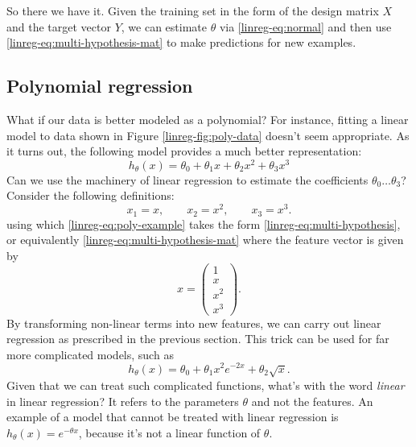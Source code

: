 \documentclass{article}
\begin{document}
So there we have it. Given the training set in the form of the design matrix $X$ and the target vector $Y$, we can estimate $\theta$ via \eqref{linreg-eq:normal} and then use \eqref{linreg-eq:multi-hypothesis-mat} to make predictions for new examples.


\subsection{Polynomial regression}
What if our data is better modeled as a polynomial? For instance, fitting a linear model to data shown in Figure \ref{linreg-fig:poly-data} doesn't seem appropriate. As it turns out, the following model provides a much better representation:
\begin{equation}
h_\theta(x) = \theta_0 + \theta_1 x + \theta_2 x^2 + \theta_3 x^3
\label{linreg-eq:poly-example}
\end{equation}
Can we use the machinery of linear regression to estimate the coefficients $\theta_0\dots\theta_3$? Consider the following definitions:
\begin{equation}
    x_1 = x, \qquad x_2 = x^2, \qquad x_3 = x^3.
\end{equation}
using which \eqref{linreg-eq:poly-example} takes the form \eqref{linreg-eq:multi-hypothesis}, or equivalently \eqref{linreg-eq:multi-hypothesis-mat} where the feature vector is given by
\begin{equation}
    x=
    \begin{pmatrix}
        1 \\
        x \\
        x^2 \\
        x^3
    \end{pmatrix}.
\end{equation}
By transforming non-linear terms into new features, we can carry out linear regression as prescribed in the previous section. This trick can be used for far more complicated models, such as
\begin{equation}
    h_{\theta}(x) = \theta_0 + \theta_1 x^2 e^{-2x} + \theta_2 \sqrt{x}.
\end{equation}
Given that we can treat such complicated functions, what's with the word \textit{linear} in linear regression? It refers to the parameters $\theta$ and not the features. An example of a model that cannot be treated with linear regression is $h_{\theta}(x) = e^{-\theta x}$, because it's not a linear function of $\theta$.
\end{document}
